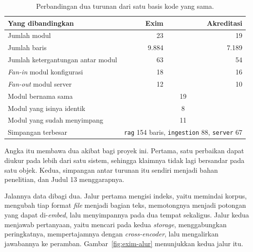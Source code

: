 \begin{table}[htbp]
  \centering
  \caption{Perbandingan dua turunan dari satu basis kode yang sama.}
  \label{tab:tiga-sistem}
  \begin{tabularx}{\textwidth}{|X|r|r|}
    \hline
    \textbf{Yang dibandingkan} & \textbf{Exim} & \textbf{Akreditasi} \\
    \hline
    Jumlah modul & 23 & 19 \\
    \hline
    Jumlah baris & 9.884 & 7.189 \\
    \hline
    Jumlah ketergantungan antar modul & 63 & 54 \\
    \hline
    \textit{Fan-in} modul konfigurasi & 18 & 16 \\
    \hline
    \textit{Fan-out} modul server & 12 & 10 \\
    \hline
    Modul bernama sama & \multicolumn{2}{c|}{19} \\
    \hline
    Modul yang isinya identik & \multicolumn{2}{c|}{8} \\
    \hline
    Modul yang sudah menyimpang & \multicolumn{2}{c|}{11} \\
    \hline
    Simpangan terbesar & \multicolumn{2}{c|}{\texttt{rag} 154 baris, \texttt{ingestion} 88, \texttt{server} 67} \\
    \hline
  \end{tabularx}
\end{table}

Angka itu membawa dua akibat bagi proyek ini. Pertama, satu perbaikan dapat
diukur pada lebih dari satu sistem, sehingga klaimnya tidak lagi bersandar
pada satu objek. Kedua, simpangan antar turunan itu sendiri menjadi bahan
penelitian, dan Judul 13 menggarapnya.

Jalannya data dibagi dua. Jalur pertama mengisi indeks, yaitu memindai korpus,
mengubah tiap format \textit{file} menjadi bagian teks, memotongnya menjadi potongan
yang dapat di-\textit{embed}, lalu menyimpannya pada dua tempat sekaligus.
Jalur kedua menjawab pertanyaan, yaitu mencari pada kedua \textit{storage},
menggabungkan peringkatnya, mempertajamnya dengan \textit{cross-encoder}, lalu
mengalirkan jawabannya ke peramban. Gambar~\ref{fig:exim-alur} menunjukkan
kedua jalur itu.


